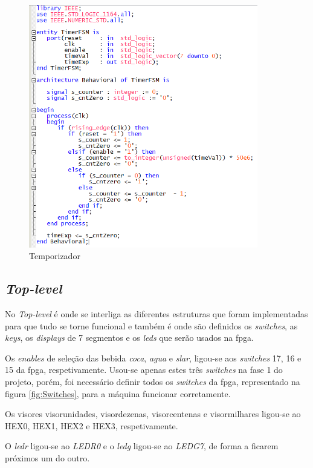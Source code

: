 \documentclass{report}
\begin{document}
\begin{figure}[H]
    \centering
    \includegraphics[width = 10cm]{TimerFSM.png}
    \caption{Temporizador}
    \label{fig:Temporizador}
\end{figure}

\newpage

\subsection{\textit{Top-level}}
No \textit{Top-level} é onde se interliga as diferentes estruturas que foram implementadas para que tudo se torne funcional e também é onde são definidos os \textit{switches}, as \textit{keys}, os \textit{displays} de 7 segmentos e os \textit{leds} que serão usados na \ac{fpga}.

Os \textit{enables} de seleção das bebida \textit{coca}, \textit{agua} e \textit{slar}, ligou-se aos \textit{switches} 17, 16 e 15 da \ac{fpga}, respetivamente. Usou-se apenas estes três \textit{switches} na fase 1 do projeto, porém, foi necessário definir todos os \textit{switches} da \ac{fpga}, representado na figura \ref{fig:Switches}, para a máquina funcionar corretamente.

Os visores visor\textunderscore unidades, visor\textunderscore dezenas, visor\textunderscore centenas e visor\textunderscore milhares ligou-se ao HEX0, HEX1, HEX2 e HEX3, respetivamente.

O \textit{ledr} ligou-se ao \textit{LEDR0} e o \textit{ledg} ligou-se ao \textit{LEDG7}, de forma a ficarem próximos um do outro. 
\end{document}
